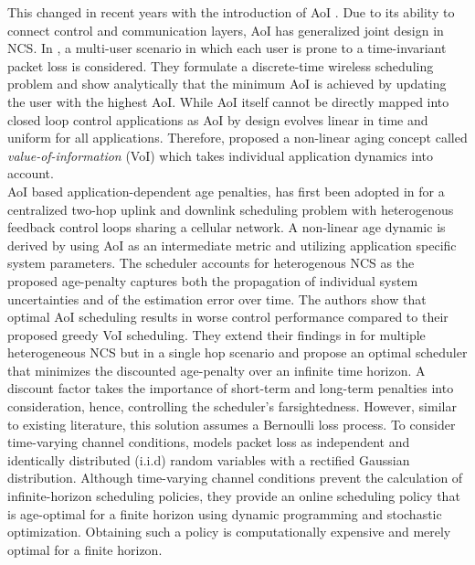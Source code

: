 This changed in recent years with the introduction of AoI \cite{kaul2012real}.
Due to its ability to connect control and communication layers, AoI has
generalized joint design in NCS. In \cite{kadota2018scheduling}, a multi-user
scenario in which each user is prone to a time-invariant packet loss is
considered. They formulate a discrete-time wireless scheduling problem and show
analytically that the minimum AoI is achieved by updating the user with the
highest AoI. While AoI itself cannot be directly mapped into closed loop control
applications as AoI by design evolves linear in time and uniform for all
applications. Therefore, \cite{kosta2017age} proposed a non-linear aging concept
called \textit{value-of-information} (VoI) which takes individual application
dynamics into account. \\
AoI based application-dependent age penalties, has first been adopted in
\cite{ayan2019age} for a centralized two-hop uplink and downlink scheduling
problem with heterogenous feedback control loops sharing a cellular network. A
non-linear age dynamic is derived by using AoI as an intermediate metric and
utilizing application specific system parameters. The scheduler accounts for
heterogenous NCS as the proposed age-penalty captures both the propagation of
individual system uncertainties and of the estimation error over time. The
authors show that optimal AoI scheduling results in worse control performance
compared to their proposed greedy VoI scheduling. They extend their findings in
\cite{ayan2020optimal} for multiple heterogeneous NCS but in a single hop
scenario and propose an optimal scheduler that minimizes the discounted
age-penalty over an infinite time horizon. A discount factor takes the
importance of short-term and long-term penalties into consideration, hence,
controlling the scheduler's farsightedness. However, similar to existing
literature, this solution assumes a Bernoulli loss process. To consider
time-varying channel conditions, \cite{ayan2020aoi} models packet loss as
independent and identically distributed (i.i.d) random variables with a
rectified Gaussian distribution. Although time-varying channel conditions
prevent the calculation of infinite-horizon scheduling policies, they provide an
online scheduling policy that is age-optimal for a finite horizon using dynamic
programming and stochastic optimization. Obtaining such a policy is
computationally expensive and merely optimal for a finite horizon.


